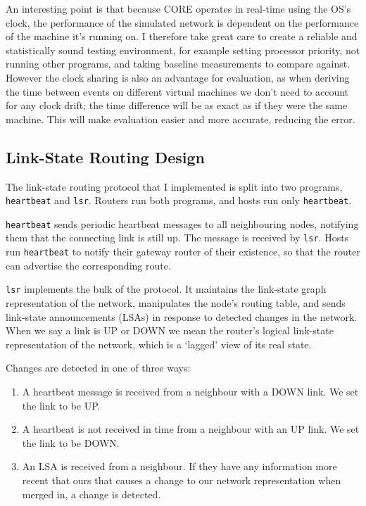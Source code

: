 \documentclass[10pt,twoside,a4paper]{article}
\begin{document}

An interesting point is that because CORE operates in real-time using the OS's clock, the performance of the simulated network is dependent on the performance of the machine it's running on. I therefore take great care to create a reliable and statistically sound testing environment, for example setting processor priority, not running other programs, and taking baseline measurements to compare against. However the clock sharing is also an advantage for evaluation, as when deriving the time between events on different virtual machines we don't need to account for any clock drift; the time difference will be as exact as if they were the same machine. This will make evaluation easier and more accurate, reducing the error.

\subsection{Link-State Routing Design}

The link-state routing protocol that I implemented is split into two programs, \texttt{heartbeat} and \texttt{lsr}.  Routers run both programs, and hosts run only \texttt{heartbeat}.

\texttt{heartbeat} sends periodic heartbeat messages to all neighbouring nodes, notifying them that the connecting link is still up. The message is received by \texttt{lsr}. Hosts run \texttt{heartbeat} to notify their gateway router of their existence, so that the router can advertise the corresponding route.

\texttt{lsr} implements the bulk of the protocol. It maintains the link-state graph representation of the network, manipulates the node's routing table, and sends link-state announcements (LSAs) in response to detected changes in the network. When we say a link is UP or DOWN we mean the router's logical link-state representation of the network, which is a `lagged' view of its real state.

Changes are detected in one of three ways:
\begin{enumerate}
	\item
	A heartbeat message is received from a neighbour with a DOWN link. We set the link to be UP.
	
	\item
	A heartbeat is not received in time from a neighbour with an UP link. We set the link to be DOWN.
	
	\item
	An LSA is received from a neighbour. If they have any information more recent that ours that causes a change to our network representation when merged in, a change is detected.
\end{enumerate}
\end{document}
